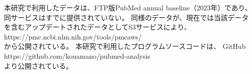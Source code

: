 本研究で利用したデータは、FTP版PubMed annual baseline（2023年）であり、同サービスはすでに提供されていない。
同様のデータが、現在では当該データを含むアップデートされたデータとしてS3サービスにより、 \\ https://pmc.ncbi.nlm.nih.gov/tools/pmcaws/ \\ から公開されている。
本研究で利用したプログラムソースコードは、 GitHub \\ https://github.com/kouamano/pubmed-analysis \\ より公開されている。

